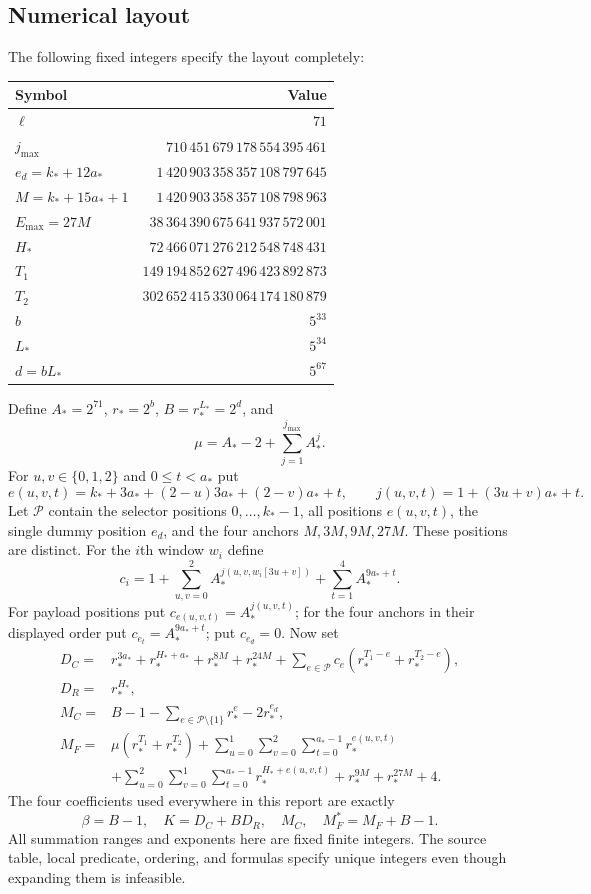 \documentclass[11pt,a4paper]{article}
\theoremstyle{remark}\newtheorem{remark}[theorem]{Remark}
\begin{document}
\subsection{Numerical layout}
The following fixed integers specify the layout completely:
\begin{center}\small
\begin{tabular}{lr}
\toprule
Symbol & Value\\
\midrule
$\ell$ & $71$\\
$j_{\max}$ & $710\,451\,679\,178\,554\,395\,461$\\
$e_d=k_*+12a_*$ & $1\,420\,903\,358\,357\,108\,797\,645$\\
$M=k_*+15a_*+1$ & $1\,420\,903\,358\,357\,108\,798\,963$\\
$E_{\max}=27M$ & $38\,364\,390\,675\,641\,937\,572\,001$\\
$H_*$ & $72\,466\,071\,276\,212\,548\,748\,431$\\
$T_1$ & $149\,194\,852\,627\,496\,423\,892\,873$\\
$T_2$ & $302\,652\,415\,330\,064\,174\,180\,879$\\
$b$ & $5^{33}$\\
$L_*$ & $5^{34}$\\
$d=bL_*$ & $5^{67}$\\
\bottomrule
\end{tabular}
\end{center}
Define $A_*=2^{71}$, $r_*=2^b$, $B=r_*^{L_*}=2^d$, and
\[
 \mu=A_*-2+\sum_{j=1}^{j_{\max}}A_*^j.
\]
For $u,v\in\{0,1,2\}$ and $0\le t<a_*$ put
\[
 e(u,v,t)=k_*+3a_*+(2-u)3a_*+(2-v)a_*+t,
 \qquad j(u,v,t)=1+(3u+v)a_*+t.
\]
Let $\mathcal P$ contain the selector positions $0,\ldots,k_*-1$,
all positions $e(u,v,t)$, the single dummy position $e_d$, and the
four anchors $M,3M,9M,27M$. These positions are distinct.
For the $i$th window $w_i$ define
\[
 c_i=1+\sum_{u,v=0}^2 A_*^{j(u,v,w_i[3u+v])}
       +\sum_{t=1}^4 A_*^{9a_*+t}.
\]
For payload positions put $c_{e(u,v,t)}=A_*^{j(u,v,t)}$;
for the four anchors in their displayed order put
$c_{e_t}=A_*^{9a_*+t}$; put $c_{e_d}=0$.
Now set
\begin{align*}
 D_C={}&r_*^{3a_*}+r_*^{H_*+a_*}+r_*^{8M}+r_*^{24M}
  +\sum_{e\in\mathcal P}c_e(r_*^{T_1-e}+r_*^{T_2-e}),\\
 D_R={}&r_*^{H_*},\\
 M_C={}&B-1-\sum_{e\in\mathcal P\setminus\{1\}}r_*^e-2r_*^{e_d},\\
 M_F={}&\mu(r_*^{T_1}+r_*^{T_2})
 +\sum_{u=0}^{1}\sum_{v=0}^{2}\sum_{t=0}^{a_*-1}r_*^{e(u,v,t)}\\
 &+\sum_{u=0}^{2}\sum_{v=0}^{1}\sum_{t=0}^{a_*-1}r_*^{H_*+e(u,v,t)}
 +r_*^{9M}+r_*^{27M}+4.
\end{align*}
The four coefficients used everywhere in this report are exactly
\[
 \boxed{\beta=B-1,\quad K=D_C+BD_R,\quad M_C,\quad M_F^*=M_F+B-1.}
\]
All summation ranges and exponents here are fixed finite integers.
The source table, local predicate, ordering, and formulas specify
unique integers even though expanding them is infeasible.
\end{document}
